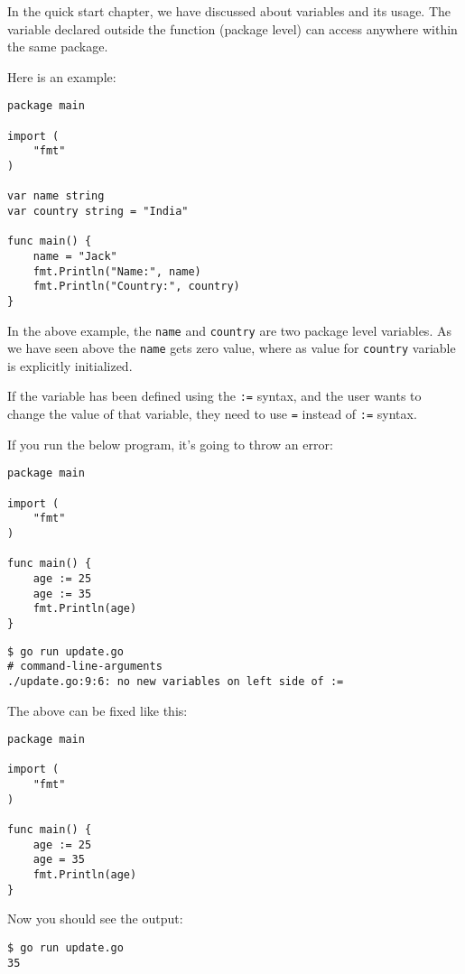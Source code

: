 In the quick start chapter, we have discussed about variables and its
usage.  The variable declared outside the function (package level) can
access anywhere within the same package.

Here is an example:

\begin{lstlisting}[caption=Package level variable]
package main

import (
    "fmt"
)

var name string
var country string = "India"

func main() {
    name = "Jack"
    fmt.Println("Name:", name)
    fmt.Println("Country:", country)
}
\end{lstlisting}

In the above example, the \texttt{name} and \texttt{country} are two
package level variables.  As we have seen above the \texttt{name} gets
zero value, where as value for \texttt{country} variable is explicitly
initialized.

If the variable has been defined using the \texttt{:=} syntax, and the
user wants to change the value of that variable, they need to
use \texttt{=} instead of \texttt{:=} syntax.

If you run the below program, it's going to throw an error:

\begin{lstlisting}[caption=Changing value with wrong syntax]
package main

import (
    "fmt"
)

func main() {
    age := 25
    age := 35
    fmt.Println(age)
}
\end{lstlisting}

\begin{lstlisting}[numbers=none]
$ go run update.go
# command-line-arguments
./update.go:9:6: no new variables on left side of :=
\end{lstlisting}

The above can be fixed like this:

\begin{lstlisting}[caption=Changing value with wrong syntax]
package main

import (
    "fmt"
)

func main() {
    age := 25
    age = 35
    fmt.Println(age)
}
\end{lstlisting}

Now you should see the output:

\begin{lstlisting}[numbers=none]
$ go run update.go
35
\end{lstlisting}


